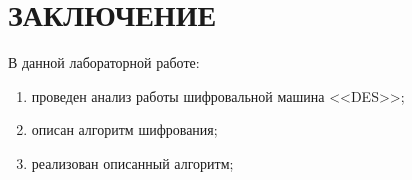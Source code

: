\clearpage
\section*{\large{ЗАКЛЮЧЕНИЕ}}
В данной лабораторной работе:
\begin{enumerate}
    \item проведен анализ работы шифровальной машина <<DES>>;
    \item описан алгоритм шифрования;
    \item реализован описанный алгоритм;
\end{enumerate}